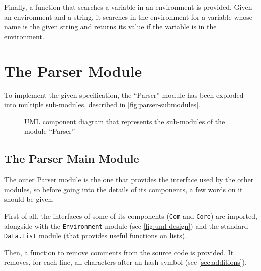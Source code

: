 \documentclass{esposito-documentation}
\begin{document}
Finally, a function that searches a variable in an environment is provided.
Given an environment and a string, it searches in the environment for a
variable whose name is the given string and returns its value if the variable
is in the environment.



\section{The Parser Module}

To implement the given specification, the ``Parser'' module has been exploded
into multiple sub-modules, described in
\autoref{fig:parser-submodules}.

\begin{figure}[H]
	\centering
	\caption{UML component diagram that represents the sub-modules of the module ``Parser''}
	\label{fig:parser-submodules}
\end{figure}

\subsection{The Parser Main Module}


The outer Parser module is the one that provides the interface used by the
other modules, so before going into the details of its components, a few words
on it should be given.

First of all, the interfaces of some of its components (\texttt{Com} and
\texttt{Core}) are imported, alongside with the \texttt{Environment} module
(see \autoref{fig:uml-design}) and the standard \texttt{Data.List} module (that
provides useful functions on lists).



Then, a function to remove comments from the source code is provided. It removes, for each line, all characters after an hash symbol (see \autoref{sec:additions}).
\end{document}
